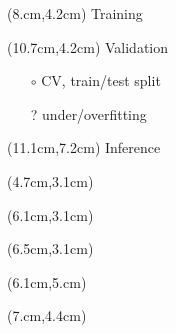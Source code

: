 \documentclass[aspectratio=169,usenames,dvipsnames]{beamer}
\begin{document}
\begin{frame}
\begin{textblock*}{11.5cm}(8.cm,4.2cm)
	\Large
	\textcolor{myorange}{Training}
\end{textblock*}


\begin{textblock*}{11.5cm}(10.7cm,4.2cm)
	\Large
	\hspace{4mm}\textcolor{myorange}{Validation}
	\vspace{2mm}
	\begin{itemize}
		\footnotesize
		\item[$\circ$] CV, train/test split
		\item[?] under/overfitting
	\end{itemize}
\end{textblock*}

\begin{textblock*}{11.5cm}(11.1cm,7.2cm)
	\Large
	\textcolor{myorange}{Inference}
\end{textblock*}


\begin{textblock*}{5cm}(4.7cm,3.1cm)
\end{textblock*}

\begin{textblock*}{5cm}(6.1cm,3.1cm)
\end{textblock*}

\begin{textblock*}{5cm}(6.5cm,3.1cm)
\end{textblock*}


\begin{textblock*}{5cm}(6.1cm,5.cm)
\end{textblock*}


\begin{textblock*}{5cm}(7.cm,4.4cm)
\end{textblock*}


\end{frame}
\end{document}

